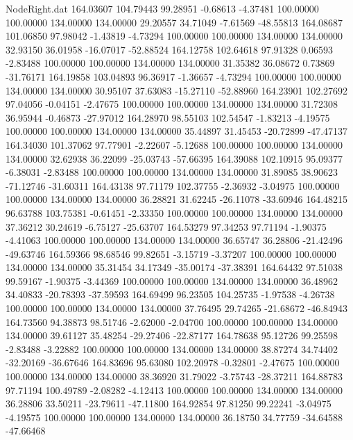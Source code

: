 \begin{filecontents}{NodeRight.dat}
 164.03607  104.79443   99.28951    -0.68613   -4.37481  100.00000  100.00000  134.00000  134.00000   29.20557   34.71049   -7.61569  -48.55813
 164.08687  101.06850   97.98042    -1.43819   -4.73294  100.00000  100.00000  134.00000  134.00000   32.93150   36.01958  -16.07017  -52.88524
 164.12758  102.64618   97.91328     0.06593   -2.83488  100.00000  100.00000  134.00000  134.00000   31.35382   36.08672    0.73869  -31.76171
 164.19858  103.04893   96.36917    -1.36657   -4.73294  100.00000  100.00000  134.00000  134.00000   30.95107   37.63083  -15.27110  -52.88960
 164.23901  102.27692   97.04056    -0.04151   -2.47675  100.00000  100.00000  134.00000  134.00000   31.72308   36.95944   -0.46873  -27.97012
 164.28970   98.55103  102.54547    -1.83213   -4.19575  100.00000  100.00000  134.00000  134.00000   35.44897   31.45453  -20.72899  -47.47137
 164.34030  101.37062   97.77901    -2.22607   -5.12688  100.00000  100.00000  134.00000  134.00000   32.62938   36.22099  -25.03743  -57.66395
 164.39088  102.10915   95.09377    -6.38031   -2.83488  100.00000  100.00000  134.00000  134.00000   31.89085   38.90623  -71.12746  -31.60311
 164.43138   97.71179  102.37755    -2.36932   -3.04975  100.00000  100.00000  134.00000  134.00000   36.28821   31.62245  -26.11078  -33.60946
 164.48215   96.63788  103.75381    -0.61451   -2.33350  100.00000  100.00000  134.00000  134.00000   37.36212   30.24619   -6.75127  -25.63707
 164.53279   97.34253   97.71194    -1.90375   -4.41063  100.00000  100.00000  134.00000  134.00000   36.65747   36.28806  -21.42496  -49.63746
 164.59366   98.68546   99.82651    -3.15719   -3.37207  100.00000  100.00000  134.00000  134.00000   35.31454   34.17349  -35.00174  -37.38391
 164.64432   97.51038   99.59167    -1.90375   -3.44369  100.00000  100.00000  134.00000  134.00000   36.48962   34.40833  -20.78393  -37.59593
 164.69499   96.23505  104.25735    -1.97538   -4.26738  100.00000  100.00000  134.00000  134.00000   37.76495   29.74265  -21.68672  -46.84943
 164.73560   94.38873   98.51746    -2.62000   -2.04700  100.00000  100.00000  134.00000  134.00000   39.61127   35.48254  -29.27406  -22.87177
 164.78638   95.12726   99.25598    -2.83488   -3.22882  100.00000  100.00000  134.00000  134.00000   38.87274   34.74402  -32.20169  -36.67646
 164.83696   95.63080  102.20978    -0.32801   -2.47675  100.00000  100.00000  134.00000  134.00000   38.36920   31.79022   -3.75743  -28.37211
 164.88783   97.71194  100.49789    -2.08282   -4.12413  100.00000  100.00000  134.00000  134.00000   36.28806   33.50211  -23.79611  -47.11800
 164.92854   97.81250   99.22241    -3.04975   -4.19575  100.00000  100.00000  134.00000  134.00000   36.18750   34.77759  -34.64588  -47.66468

\end{filecontents}
